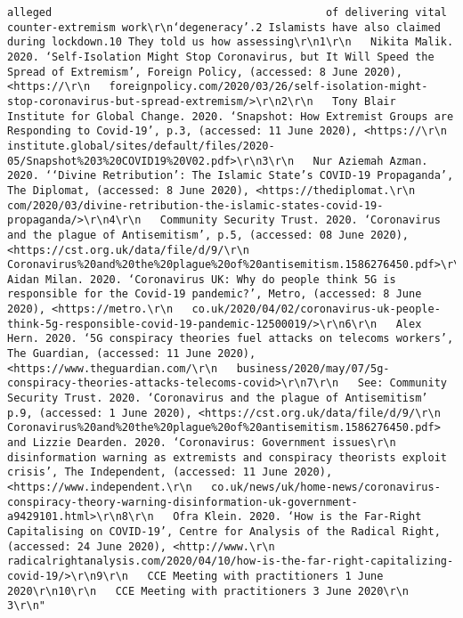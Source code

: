 \documentclass[
]{book}
\begin{document}
\begin{verbatim}
alleged                                           of delivering vital counter-extremism work\r\n‘degeneracy’.2 Islamists have also claimed                                         during lockdown.10 They told us how assessing\r\n1\r\n   Nikita Malik. 2020. ‘Self-Isolation Might Stop Coronavirus, but It Will Speed the Spread of Extremism’, Foreign Policy, (accessed: 8 June 2020), <https://\r\n   foreignpolicy.com/2020/03/26/self-isolation-might-stop-coronavirus-but-spread-extremism/>\r\n2\r\n   Tony Blair Institute for Global Change. 2020. ‘Snapshot: How Extremist Groups are Responding to Covid-19’, p.3, (accessed: 11 June 2020), <https://\r\n   institute.global/sites/default/files/2020-05/Snapshot%203%20COVID19%20V02.pdf>\r\n3\r\n   Nur Aziemah Azman. 2020. ‘‘Divine Retribution’: The Islamic State’s COVID-19 Propaganda’, The Diplomat, (accessed: 8 June 2020), <https://thediplomat.\r\n   com/2020/03/divine-retribution-the-islamic-states-covid-19-propaganda/>\r\n4\r\n   Community Security Trust. 2020. ‘Coronavirus and the plague of Antisemitism’, p.5, (accessed: 08 June 2020), <https://cst.org.uk/data/file/d/9/\r\n   Coronavirus%20and%20the%20plague%20of%20antisemitism.1586276450.pdf>\r\n5\r\n   Aidan Milan. 2020. ‘Coronavirus UK: Why do people think 5G is responsible for the Covid-19 pandemic?’, Metro, (accessed: 8 June 2020), <https://metro.\r\n   co.uk/2020/04/02/coronavirus-uk-people-think-5g-responsible-covid-19-pandemic-12500019/>\r\n6\r\n   Alex Hern. 2020. ‘5G conspiracy theories fuel attacks on telecoms workers’, The Guardian, (accessed: 11 June 2020), <https://www.theguardian.com/\r\n   business/2020/may/07/5g-conspiracy-theories-attacks-telecoms-covid>\r\n7\r\n   See: Community Security Trust. 2020. ‘Coronavirus and the plague of Antisemitism’ p.9, (accessed: 1 June 2020), <https://cst.org.uk/data/file/d/9/\r\n   Coronavirus%20and%20the%20plague%20of%20antisemitism.1586276450.pdf> and Lizzie Dearden. 2020. ‘Coronavirus: Government issues\r\n   disinformation warning as extremists and conspiracy theorists exploit crisis’, The Independent, (accessed: 11 June 2020), <https://www.independent.\r\n   co.uk/news/uk/home-news/coronavirus-conspiracy-theory-warning-disinformation-uk-government-a9429101.html>\r\n8\r\n   Ofra Klein. 2020. ‘How is the Far-Right Capitalising on COVID-19’, Centre for Analysis of the Radical Right, (accessed: 24 June 2020), <http://www.\r\n   radicalrightanalysis.com/2020/04/10/how-is-the-far-right-capitalizing-covid-19/>\r\n9\r\n   CCE Meeting with practitioners 1 June 2020\r\n10\r\n   CCE Meeting with practitioners 3 June 2020\r\n                                                                                3\r\n"

\end{verbatim}
\end{document}
